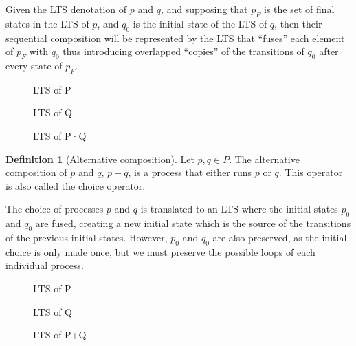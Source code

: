 \documentclass[11pt]{article}
\theoremstyle{definition}
\newtheorem{definition}{Definition}
\theoremstyle{plain}
\theoremstyle{definition}
\begin{document}
Given the LTS denotation of $ p $ and $ q $, and supposing that $ p_F $ is the set of final states in the LTS of $ p $, and $ q_0 $ is the initial state of the LTS of $ q $, then their sequential composition will be represented by the LTS that ``fuses'' each element of $ p_F $ with $ q_0 $ thus introducing overlapped ``copies'' of the transitions of $ q_0 $ after every state of $ p_F $.
\begin{figure}[H]
	\centering
	
	\caption{LTS of P} \label{fig:SequentialCompositionP}
	\endminipage\hfill
	\centering
	
	\caption{LTS of Q} \label{fig:SequentialCompositionP}
	\endminipage\hfill
	\centering
	
	\caption{LTS of P·Q} \label{fig:SequentialCompositionP}
	\endminipage\hfill
\end{figure}

\begin{definition} [Alternative composition]
	Let $ p, q \in P$. The alternative composition of $ p $ and $ q $, $ p + q $, is a process that either runs $ p $ or $ q $. This operator is also called the choice operator.
\end{definition}

The choice of processes $ p $ and $ q $ is translated to an LTS where the initial states $ p_0 $ and $ q_0 $ are fused, creating a new initial state which is the source of the transitions of the previous initial states. However, $ p_0 $ and $ q_0 $ are also preserved, as the initial choice is only made once, but we must preserve the possible loops of each individual process.

\begin{figure}[H]
	\centering
	
	\caption{LTS of P} \label{fig:AlternativeCompositionP}
	\endminipage\hfill
	\centering
	
	\caption{LTS of Q} \label{fig:AlternativeCompositionQ}
	\endminipage\hfill
\end{figure}
\begin{figure} [H]
	\centering
	
	\caption{LTS of P+Q} \label{fig:AlternativeCompositionPQ}
\end{figure}
\end{document}
